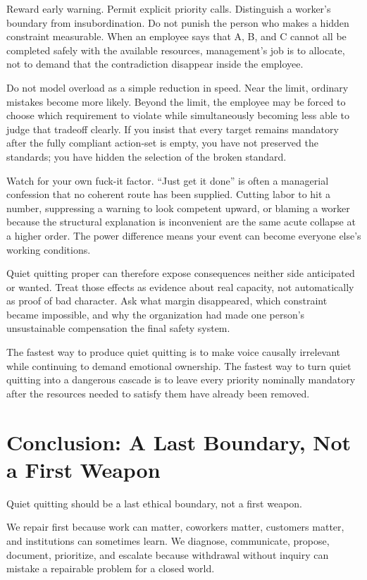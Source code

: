 \documentclass[11pt,oneside]{article}
\begin{document}
Reward early warning. Permit explicit priority calls. Distinguish a
worker's boundary from insubordination. Do not punish the person who
makes a hidden constraint measurable. When an employee says that A, B,
and C cannot all be completed safely with the available resources,
management's job is to allocate, not to demand that the contradiction
disappear inside the employee.

Do not model overload as a simple reduction in speed. Near the limit,
ordinary mistakes become more likely. Beyond the limit, the employee may
be forced to choose which requirement to violate while simultaneously
becoming less able to judge that tradeoff clearly. If you insist that
every target remains mandatory after the fully compliant action-set is
empty, you have not preserved the standards; you have hidden the
selection of the broken standard.

Watch for your own fuck-it factor. ``Just get it done'' is often a
managerial confession that no coherent route has been supplied. Cutting
labor to hit a number, suppressing a warning to look competent upward,
or blaming a worker because the structural explanation is inconvenient
are the same acute collapse at a higher order. The power difference
means your event can become everyone else's working conditions.

Quiet quitting proper can therefore expose consequences neither side
anticipated or wanted. Treat those effects as evidence about real
capacity, not automatically as proof of bad character. Ask what margin
disappeared, which constraint became impossible, and why the
organization had made one person's unsustainable compensation the final
safety system.

The fastest way to produce quiet quitting is to make voice causally
irrelevant while continuing to demand emotional ownership. The fastest
way to turn quiet quitting into a dangerous cascade is to leave every
priority nominally mandatory after the resources needed to satisfy them
have already been removed.

\section{Conclusion: A Last Boundary, Not a First
Weapon}\label{conclusion-a-last-boundary-not-a-first-weapon}

Quiet quitting should be a last ethical boundary, not a first weapon.

We repair first because work can matter, coworkers matter, customers
matter, and institutions can sometimes learn. We diagnose, communicate,
propose, document, prioritize, and escalate because withdrawal without
inquiry can mistake a repairable problem for a closed world.
\end{document}
